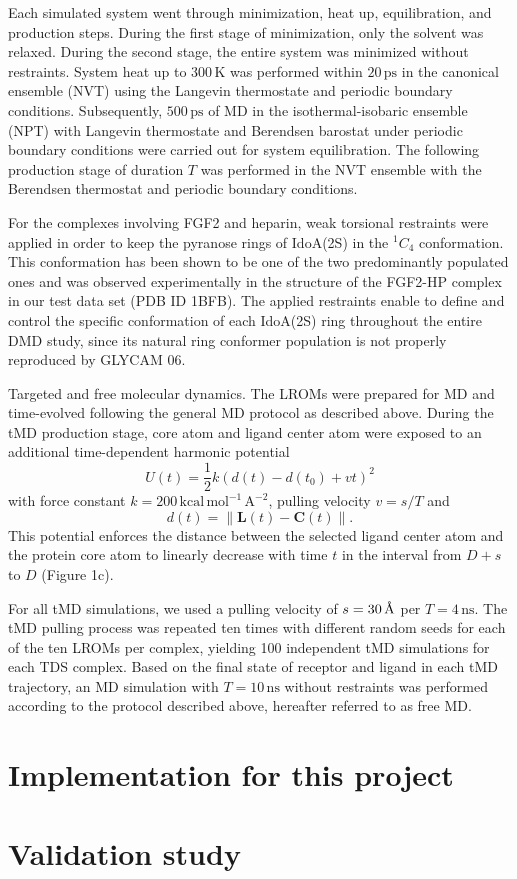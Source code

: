 Each simulated system went through minimization, heat up, equilibration, and
production steps. During the first stage of minimization, only the solvent was
relaxed. During the second stage, the entire system was minimized without
restraints. System heat up to $300\,\mathrm{K}$ was performed within $20\,\mathrm{ps}$ in the canonical
ensemble (NVT) using the Langevin thermostate and periodic boundary conditions.
Subsequently, $500\,\mathrm{ps}$ of MD in the isothermal-isobaric ensemble (NPT) with
Langevin thermostate and Berendsen barostat under periodic boundary conditions
were carried out for system equilibration. The following production stage of
duration $T$ was performed in the NVT ensemble with the Berendsen thermostat and
periodic boundary conditions.

For the complexes involving FGF2 and heparin, weak torsional restraints were applied in order to keep the
pyranose rings of IdoA(2S) in the $^{1}C_4$ conformation. This conformation has been shown to be one
of the two predominantly populated ones{\cite{almond_jacs_2010}}
and was observed experimentally in the structure of the FGF2-HP complex in our test data set (PDB ID 1BFB).
The applied restraints enable to define and control the specific conformation of each IdoA(2S) ring
throughout the entire DMD study, since its natural ring conformer population is not properly
reproduced by GLYCAM 06{\cite{gandhi_idoa2s_2010}}.





{\sffamily \small Targeted and free molecular dynamics.}
The LROMs were prepared for MD and time-evolved following the general MD
protocol as described above. During the tMD production stage, core
atom and ligand center atom were exposed to an additional time-dependent
harmonic potential
\begin{equation}
U(t) = \frac{1}{2} k \left( d(t)-d(t_0) + vt   \right)^2
\end{equation}
with force constant $k=200\,\mathrm{kcal\,mol^{-1}\,A^{-2}}$, pulling velocity
$ v = s/T$ and
\begin{equation}
d(t) = \lVert \bm{L}(t)-\bm{C}(t) \rVert.
\end{equation}
This potential enforces the distance between the selected ligand center atom and
the protein core atom to linearly decrease with time $t$ in the interval from $D+s$ to $D$
(Figure 1c).

For all tMD simulations, we used a pulling velocity of $s=30\,\textup{\AA}$ per $T=4\,\mathrm{ns}$.
The tMD pulling process was repeated ten times with different
random seeds for each of the ten LROMs per complex, yielding 100 independent tMD
simulations for each TDS complex. Based on the final state of receptor and
ligand in each tMD trajectory, an MD simulation with
$T=10\,\mathrm{ns}$ without restraints was performed according to the protocol described
above, hereafter referred to as free MD.
\section{Implementation for this project}
\lipsum[1-5]
\section{Validation study}
\lipsum[1-5]
